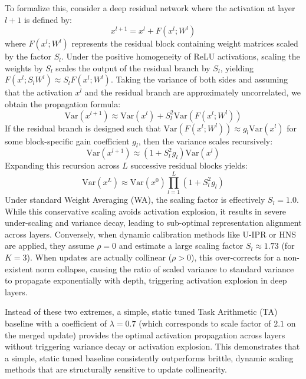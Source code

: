 \documentclass{article}
\theoremstyle{plain}
\theoremstyle{definition}
\theoremstyle{remark}
\begin{document}
To formalize this, consider a deep residual network where the activation at layer $l+1$ is defined by:
\begin{equation}
    x^{l+1} = x^l + F(x^l; W^l)
\end{equation}
where $F(x^l; W^l)$ represents the residual block containing weight matrices scaled by the factor $S_l$. Under the positive homogeneity of ReLU activations, scaling the weights by $S_l$ scales the output of the residual branch by $S_l$, yielding $F(x^l; S_l W^l) \approx S_l F(x^l; W^l)$. Taking the variance of both sides and assuming that the activation $x^l$ and the residual branch are approximately uncorrelated, we obtain the propagation formula:
\begin{equation}
    \text{Var}(x^{l+1}) \approx \text{Var}(x^l) + S_l^2 \text{Var}(F(x^l; W^l))
\end{equation}
If the residual branch is designed such that $\text{Var}(F(x^l; W^l)) \approx g_l \text{Var}(x^l)$ for some block-specific gain coefficient $g_l$, then the variance scales recursively:
\begin{equation}
    \text{Var}(x^{l+1}) \approx (1 + S_l^2 g_l) \text{Var}(x^l)
\end{equation}
Expanding this recursion across $L$ successive residual blocks yields:
\begin{equation}
    \text{Var}(x^L) \approx \text{Var}(x^0) \prod_{l=1}^L (1 + S_l^2 g_l)
\end{equation}
Under standard Weight Averaging (WA), the scaling factor is effectively $S_l = 1.0$. While this conservative scaling avoids activation explosion, it results in severe under-scaling and variance decay, leading to sub-optimal representation alignment across layers. Conversely, when dynamic calibration methods like U-IPR or HNS are applied, they assume $\rho = 0$ and estimate a large scaling factor $S_l \approx 1.73$ (for $K=3$). When updates are actually collinear ($\rho > 0$), this over-corrects for a non-existent norm collapse, causing the ratio of scaled variance to standard variance to propagate exponentially with depth, triggering activation explosion in deep layers.

Instead of these two extremes, a simple, static tuned Task Arithmetic (TA) baseline with a coefficient of $\lambda = 0.7$ (which corresponds to scale factor of $2.1$ on the merged update) provides the optimal activation propagation across layers without triggering variance decay or activation explosion. This demonstrates that a simple, static tuned baseline consistently outperforms brittle, dynamic scaling methods that are structurally sensitive to update collinearity.
\end{document}
